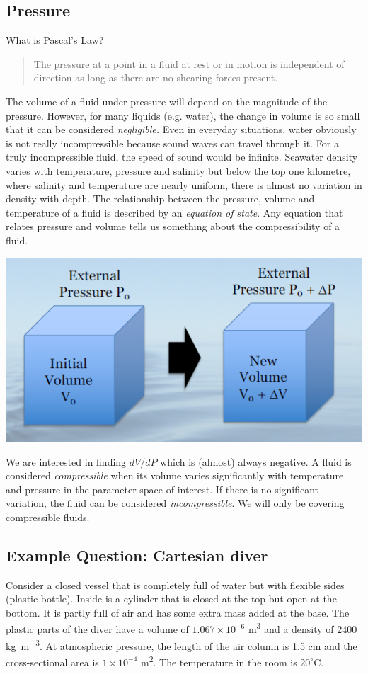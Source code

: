 \documentclass[class=report, crop=false, 12pt,a4paper]{standalone}
\begin{document}
\subsection{Pressure}
What is Pascal's Law?
\begin{quote}
  \begin{center}
    The pressure at a point in a fluid at rest or in motion is independent of direction as long as there are no shearing forces present.
  \end{center}
\end{quote}
The volume of a fluid under pressure will depend on the magnitude of the pressure. However, for many liquids (e.g. water), the change in volume is so small that it can be considered \emph{negligible.} Even in everyday situations, water obviously is not really incompressible because sound waves can travel through it. For a truly incompressible fluid, the speed of sound would be infinite. Seawater density varies with temperature, pressure and salinity but below the top one kilometre, where salinity and temperature are nearly uniform, there is almost no variation in density with depth. The relationship between the pressure, volume and temperature of a fluid is described by an \emph{equation of state}. Any equation that relates pressure and volume tells us something about the compressibility of a fluid. 
\begin{center}
  \includegraphics[width = 0.8 \textwidth]{../img/CompressibilityOfFluid}
\end{center}
We are interested in finding \( dV/dP\) which is (almost) always negative. A fluid is considered \emph{compressible} when its volume varies significantly with temperature and pressure in the parameter space of interest. If there is no significant variation, the fluid can be considered \emph{incompressible}. We will only be covering compressible fluids.

\subsection{Example Question: Cartesian diver}
Consider a closed vessel that is completely full of water but with flexible sides (plastic bottle). Inside is a cylinder that is closed at the top but open at the bottom. It is partly full of air and has some extra mass added at the base. The plastic parts of the diver have a volume of \(1.067\times 10^{-6} \) \si{\meter\cubed} and a density of \(2400\) \si{\kg\per\meter\cubed}. At atmospheric pressure, the length of the air column is 1.5 \si{\cm} and the cross-sectional area is \(1\times 10^{-4}\) \si{\meter\squared}. The temperature in the room is \(20^{\circ}\)C. 
\end{document}
